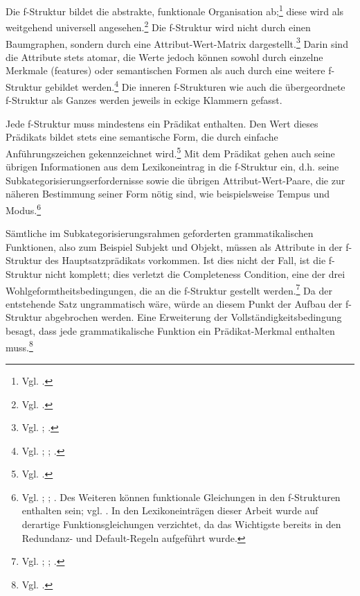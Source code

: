 \documentclass[12pt,a4paper]{article}
\begin{document}
Die f-Struktur bildet die abstrakte, funktionale Organisation ab;\footnote{Vgl. \cite[7]{Dal}.} diese wird als weitgehend universell angesehen.\footnote{Vgl. \cite[7; 9]{Bresnan}.} Die f-Struktur wird nicht durch einen Baumgraphen, sondern durch eine Attribut-Wert-Matrix dargestellt.\footnote{Vgl. \cite[55]{Falk}; \cite[7]{Skript}.} Darin sind die Attribute stets atomar, die Werte jedoch können sowohl durch einzelne Merkmale (features) oder semantischen Formen als auch durch eine weitere f-Struktur gebildet werden.\footnote{Vgl. \cite[55]{Falk}; \cite[13]{Rohrer}; \cite[8]{Skript}.} Die inneren f-Strukturen wie auch die übergeordnete f-Struktur als Ganzes werden jeweils in eckige Klammern gefasst.

Jede f-Struktur muss mindestens ein Prädikat enthalten. Den Wert dieses Prädikats bildet stets eine semantische Form, die durch einfache Anführungszeichen gekennzeichnet wird.\footnote{Vgl. \cite[8]{Skript}.} Mit dem Prädikat gehen auch seine übrigen Informationen aus dem Lexikoneintrag in die f-Struktur ein, d.h. seine Subkategorisierungserfordernisse sowie die übrigen Attribut-Wert-Paare, die zur näheren Bestimmung seiner Form nötig sind, wie beispielsweise Tempus und Modus.\footnote{Vgl. \cite[13; 23; 28-9]{Rohrer}; \cite[7; 9]{Skript}; \cite[7]{Dal}. Des Weiteren können funktionale Gleichungen in den f-Strukturen enthalten sein; vgl. \cite[21]{Rohrer}. In den Lexikoneinträgen dieser Arbeit wurde auf derartige Funktionsgleichungen verzichtet, da das Wichtigste bereits in den Redundanz- und Default-Regeln aufgeführt wurde.} 

Sämtliche im Subkategorisierungsrahmen geforderten grammatikalischen Funktionen, also zum Beispiel Subjekt und Objekt, müssen als Attribute in der f-Struktur des Hauptsatzprädikats vorkommen. Ist dies nicht der Fall, ist die f-Struktur nicht komplett; dies verletzt die Completeness Condition, eine der drei Wohlgeformtheitsbedingungen, die an die f-Struktur gestellt werden.\footnote{Vgl. \cite[58-9]{Falk}; \cite[28]{Rohrer}; \cite[19-20]{Skript}.} Da der entstehende Satz ungrammatisch wäre, würde an diesem Punkt der Aufbau der f-Struktur abgebrochen werden. Eine Erweiterung der Vollständigkeitsbedingung besagt, dass jede grammatikalische Funktion ein Prädikat-Merkmal enthalten muss.\footnote{Vgl. \cite[61]{Falk}.}
\end{document}
